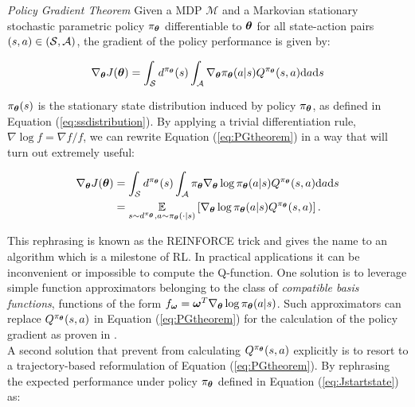 \begin{theorem} \label{th:PGtheorem}
\emph{Policy Gradient Theorem} Given a \gls{MDP} $\mathcal{M}$ and a  Markovian stationary stochastic parametric policy $\pi_{\boldsymbol{\theta}}$ differentiable \wrt to $\boldsymbol{\theta}$ for all state-action pairs $(s,a)\in(\mathcal{S},\mathcal{A})$, the gradient of the policy performance is given by:

\begin{equation}
\nabla_{\boldsymbol{\theta}}J(\boldsymbol{\theta}) 
= \int_{\mathcal{S}}d^{\pi_{\boldsymbol{\theta}}}(s)\int_{\mathcal{A}}\nabla_{\boldsymbol{\theta}}\pi_{\boldsymbol{\theta}}(a|s)Q^{\pi_{\boldsymbol{\theta}}}(s,a)\mathrm{d}a\mathrm{d}s \nonumber \label{eq:PGtheorem}
\end{equation}
\end{theorem}

$\pi_{\boldsymbol{\theta}}(s)$ is the stationary state distribution induced by policy $\pi_{\boldsymbol{\theta}}$, as defined in Equation (\ref{eq:ssdistribution}). By applying a trivial differentiation rule, $\nabla\log f=\nabla f/f$, we can rewrite Equation (\ref{eq:PGtheorem}) in a way that will turn out extremely useful:

\begin{align}
\nabla_{\boldsymbol{\theta}}J(\boldsymbol{\theta}) 
&= \int_{\mathcal{S}}d^{\pi_{\boldsymbol{\theta}}}(s)\int_{\mathcal{A}}\pi_{\boldsymbol{\theta}}\nabla_{\boldsymbol{\theta}}\log\pi_{\boldsymbol{\theta}}(a|s)Q^{\pi_{\boldsymbol{\theta}}}(s,a)\mathrm{d}a\mathrm{d}s \nonumber \\
&= \underset{s\sim d^{\pi_{\boldsymbol{\theta}}}, a\sim \pi_{\boldsymbol{\theta}}(\cdot|s)}{\mathbb{E}}\left[{\nabla_{\boldsymbol{\theta}}\log\pi_{\boldsymbol{\theta}}(a|s)Q^{\pi_{\boldsymbol{\theta}}}(s,a)}\right] . \label{eq:reinforcetrick} 
\end{align}

This rephrasing is known as the REINFORCE trick \cite{williams1992simple} and gives the name to an algorithm which is a milestone of \gls{RL}.
In practical applications it can be inconvenient or impossible to compute the Q-function. One solution is to leverage simple function approximators belonging to the class of \emph{compatible basis functions}, \ie functions of the form $f_{\boldsymbol{\omega}}=\boldsymbol{\omega}^{T}\nabla_{\boldsymbol{\theta}}\log\pi_{\boldsymbol{\theta}}(a|s)$. Such approximators can replace $Q^{\pi_{\boldsymbol{\theta}}}(s,a)$ in Equation (\ref{eq:PGtheorem}) for the calculation of the policy gradient as proven in \cite{sutton2000policy}.\\
A second solution that prevent from calculating $Q^{\pi_{\boldsymbol{\theta}}}(s,a)$ explicitly is to resort to a trajectory-based reformulation of Equation (\ref{eq:PGtheorem}). By rephrasing the expected performance under policy $\pi_{\boldsymbol{\theta}}$ defined in Equation (\ref{eq:Jstartstate}) as:

